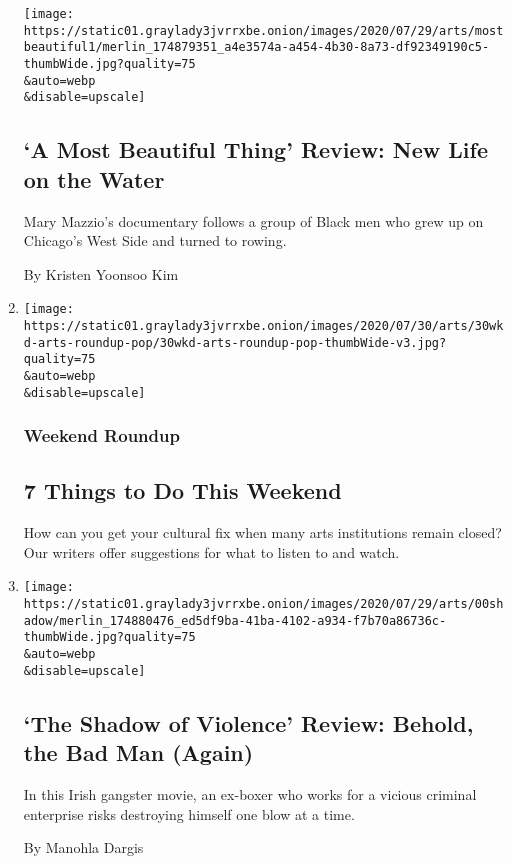 \begin{enumerate}
  \texttt{[image: https://static01.graylady3jvrrxbe.onion/images/2020/07/29/arts/mostbeautiful1/merlin\_174879351\_a4e3574a-a454-4b30-8a73-df92349190c5-thumbWide.jpg?quality=75\\\&auto=webp\\\&disable=upscale]}

  \hypertarget{a-most-beautiful-thing-review-new-life-on-the-water}{%
  \subsection{`A Most Beautiful Thing' Review: New Life on the
  Water}\label{a-most-beautiful-thing-review-new-life-on-the-water}}

  Mary Mazzio's documentary follows a group of Black men who grew up on
  Chicago's West Side and turned to rowing.

  By Kristen Yoonsoo Kim
\item
  \href{/2020/07/30/arts/things-to-do-weekend-coronavirus.html}{}

  \texttt{[image: https://static01.graylady3jvrrxbe.onion/images/2020/07/30/arts/30wkd-arts-roundup-pop/30wkd-arts-roundup-pop-thumbWide-v3.jpg?quality=75\\\&auto=webp\\\&disable=upscale]}

  \hypertarget{weekend-roundup}{%
  \subsubsection{Weekend Roundup}\label{weekend-roundup}}

  \hypertarget{7-things-to-do-this-weekend}{%
  \subsection{7 Things to Do This
  Weekend}\label{7-things-to-do-this-weekend}}

  How can you get your cultural fix when many arts institutions remain
  closed? Our writers offer suggestions for what to listen to and watch.
\item
  \href{/2020/07/30/movies/the-shadow-of-violence-review.html}{}

  \texttt{[image: https://static01.graylady3jvrrxbe.onion/images/2020/07/29/arts/00shadow/merlin\_174880476\_ed5df9ba-41ba-4102-a934-f7b70a86736c-thumbWide.jpg?quality=75\\\&auto=webp\\\&disable=upscale]}

  \hypertarget{the-shadow-of-violence-review-behold-the-bad-man-again}{%
  \subsection{`The Shadow of Violence' Review: Behold, the Bad Man
  (Again)}\label{the-shadow-of-violence-review-behold-the-bad-man-again}}

  In this Irish gangster movie, an ex-boxer who works for a vicious
  criminal enterprise risks destroying himself one blow at a time.

  By Manohla Dargis
\end{enumerate}

